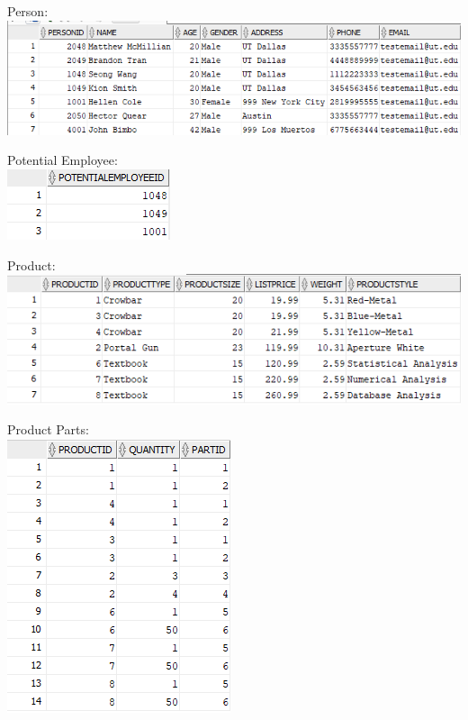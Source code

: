 \documentclass[12pt]{article}
\begin{document}
\begin{enumerate}
\begin{center}
		\end{center}
		\begin{center}
				Person:\\
				\includegraphics[scale=1.0]{completed_diags/states/person}
		\end{center}
		\begin{center}
				Potential Employee:\\
				\includegraphics[scale=1.5]{completed_diags/states/PotentialEmployee}
		\end{center}
		\begin{center}
				Product:\\
				\includegraphics[scale=1.0]{completed_diags/states/Product}
		\end{center}
		\begin{center}
				Product Parts:\\
				\includegraphics[scale=1.5]{completed_diags/states/Product_Parts}

\end{center}
\end{enumerate}
\end{document}
